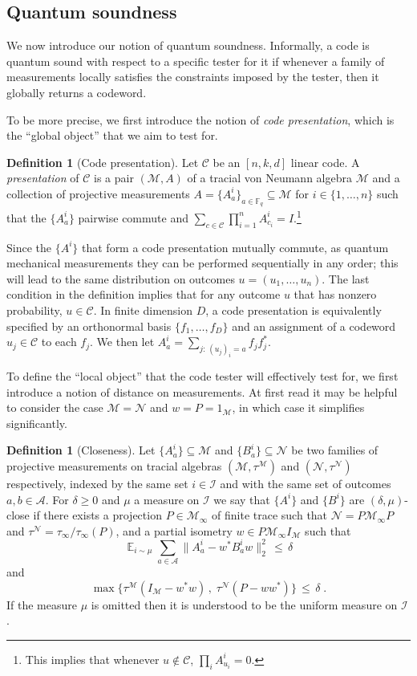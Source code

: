 \documentclass[11pt]{article}
\theoremstyle{definition}
\newtheorem{definition}[theorem]{Definition}
\newcommand{\code}{\mathcal{C}}
\newcommand{\Id}{\ensuremath{I}}
\DeclareMathOperator*{\Expectation}{\mathbb{E}}
\newcommand{\Es}[1]{\Expectation_{#1}}
\newcommand{\F}{\ensuremath{\mathbb{F}}}
\newcommand{\mA}{\ensuremath{\mathcal{A}}}
\newcommand{\mM}{\ensuremath{\mathcal{M}}}
\newcommand{\mI}{\ensuremath{\mathcal{I}}}
\newcommand{\mN}{\mathcal{N}}
\begin{document}
\subsection{Quantum soundness}
\label{sec:q-soundness}

We now introduce our notion of quantum soundness. Informally, a code is quantum sound with respect to a specific tester for it if whenever a family of measurements locally satisfies the constraints imposed by the tester, then it globally returns a codeword. 

To be more precise, we first introduce the notion of \emph{code presentation}, which is the ``global object'' that we aim to test for. 

\begin{definition}[Code presentation]
Let $\code$ be an $[n,k,d]$ linear code. A \emph{presentation} of $\code$ is a pair $(\mM,A)$ of a tracial von Neumann algebra $\mM$ and a collection of projective measurements $A = \{A^i_a\}_{a\in\F_q} \subseteq\mM$ for $i\in\{1,\ldots,n\}$ such that the $\{A^i_a\}$ pairwise commute and $\sum_{c\in\code} \prod_{i=1}^n A^i_{c_i}=\Id$.\footnote{This implies that whenever $u\notin \code$, $\prod_i A^i_{u_i}=0$.} 
\end{definition}

Since the $\{A^i\}$ that form a code presentation mutually commute, as quantum mechanical measurements they can be performed sequentially in any order; this will lead to the same distribution on outcomes $u=(u_1,\ldots,u_n)$. The last condition in the definition implies that for any outcome $u$ that has nonzero probability, $u\in \code$. In finite dimension $D$, a code presentation is equivalently specified by an orthonormal basis $\{f_1,\ldots,f_D\}$ and an assignment of a codeword $u_j\in \code$ to each $f_j$. We then let $A^i_a = \sum_{j:\, (u_j)_i=a} f_j f_j^*$. 

To define the ``local object'' that the code tester will effectively test for, we first introduce a notion of distance on measurements. At first read it may be helpful to consider the case $\mM=\mN$ and $w=P=1_\mM$, in which case it simplifies significantly. 


	\begin{definition}[Closeness]\label{def:close}
Let $\{A^i_a\}\subseteq \mM$ and $\{B^i_a\}\subseteq \mN$ be two families of projective measurements on  tracial algebras $(\mM,\tau^\mM)$ and $(\mN,\tau^\mN)$ respectively, indexed by the same set $i\in \mI$ and with the same set of outcomes $a,b\in\mA$. For $\delta\geq0$ and $\mu$ a measure on $\mI$ we say that $\{A^i\}$ and $\{B^i\}$ are $(\delta,\mu)$-close if there exists a projection $P\in\mM_\infty$ of finite trace such that $\mN=P\mM_\infty P$ and $\tau^\mN=\tau_\infty/\tau_\infty(P)$, and a partial isometry $w\in P \mM_\infty \Id_\mM$ such that 
\[ \Es{i\sim\mu} \sum_{a\in\mA} \big\| A^i_a - w^* B^i_a w \big\|_2^2 \,\leq\,\delta\]
and 
\[\max\big\{ \tau^\mM(\Id_\mM-w^*w)\,,\; \tau^\mN(P-ww^*)\big\} \,\leq\, \delta\;.\]
If the measure $\mu$ is omitted then it is understood to be the uniform measure on $\mI$.
\end{definition}
\end{document}
